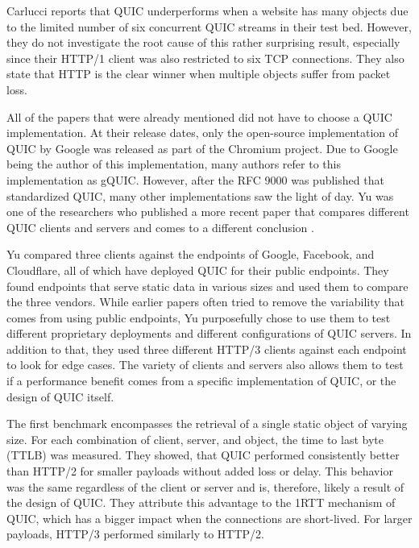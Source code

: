 \documentclass[conference]{IEEEtran}
\begin{document}
Carlucci \cite{HTTPoverUDP} reports that QUIC underperforms when a website has many objects due to the limited number of six concurrent QUIC streams in their test bed. However, they do not investigate the root cause of this rather surprising result, especially since their HTTP/1 client was also restricted to six TCP connections. They also state that HTTP is the clear winner when multiple objects suffer from packet loss.


All of the papers that were already mentioned did not have to choose a QUIC implementation. At their release dates, only the open-source implementation of QUIC by Google was released as part of the Chromium project. Due to Google being the author of this implementation, many authors refer to this implementation as gQUIC. However, after the RFC 9000 was published that standardized QUIC, many other implementations saw the light of day. Yu was one of the researchers who published a more recent paper that compares different QUIC clients and servers and comes to a different conclusion \cite{Yu2}. 

Yu compared three clients against the endpoints of Google, Facebook, and Cloudflare, all of which have deployed QUIC for their public endpoints. They found endpoints that serve static data in various sizes and used them to compare the three vendors. While earlier papers often tried to remove the variability that comes from using public endpoints, Yu purposefully chose to use them to test different proprietary deployments and different configurations of QUIC servers. In addition to that, they used three different HTTP/3 clients against each endpoint to look for edge cases. The variety of clients and servers also allows them to test if a performance benefit comes from a specific implementation of QUIC, or the design of QUIC itself.

The first benchmark encompasses the retrieval of a single static object of varying size. For each combination of client, server, and object, the time to last byte (TTLB) was measured. They showed, that QUIC performed consistently better than HTTP/2 for smaller payloads without added loss or delay. This behavior was the same regardless of the client or server and is, therefore, likely a result of the design of QUIC. They attribute this advantage to the 1RTT mechanism of QUIC, which has a bigger impact when the connections are short-lived. For larger payloads, HTTP/3 performed similarly to HTTP/2.
\end{document}
